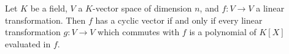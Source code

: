 \documentclass[12pt]{article}
\begin{document}
Let $K$ be a field, $V$ a $K$-vector space of dimension $n$,
and $f:V\longrightarrow V$ a linear transformation. Then $f$
has a cyclic vector if and only if every linear transformation $g:V\longrightarrow V$ which commutes with $f$ is a polynomial of $K[X]$ evaluated in $f$.
\end{document}
